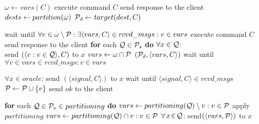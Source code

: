 \begin{algorithm}[h!]
\small

\begin{distribalgo}[1]

	\STATE $\omega \leftarrow vars(C)$
		\STATE execute command $C$
		\STATE send response to the client
		\STATE $dests \leftarrow partition(\omega)$
		\STATE $\mathcal{P}_d \leftarrow target(dest, C)$

			\STATE wait until $\forall v \in \omega \setminus \mathcal{P}: \exists \langle vars, C \rangle \in rcvd\_msgs :v \in vars$
			\STATE execute command $C$
			\STATE send response to the client
			\STATE \textbf{for} each $\mathcal{Q} \in \mathcal{P}_s$ \textbf{do} $\forall x \in \mathcal{Q}$: \\
				\hfill send $(\langle v:v \in \mathcal{Q} \rangle, C)$ to $x$
			\STATE $vars \leftarrow \omega \cap \mathcal{P}$
			\STATE \rmcast$(\mathcal{P}_d, \langle vars, C \rangle)$
			\STATE wait until $\forall v \in vars \in rcvd\_msgs : v \in vars$
		\ENDIF		
	\ENDIF
\ENDINDENT

\vspace{1.0mm}

\vspace{1.0mm}
	\STATE $\forall x \in oracle$: send $(\langle signal, C \rangle )$ to $x$
	\STATE wait until $\langle signal, C \rangle \in rcvd\_msgs$
	\STATE $\mathcal{P} \leftarrow \mathcal{P} \cup \{v\}$
	\STATE send $ok$ to the client
\ENDINDENT

\vspace{1.0mm}
	\STATE \textbf{for} each $\mathcal{Q} \in \mathcal{P}_v \in partitioning$ \textbf{do} 
			\STATE $vars \leftarrow partitioning(\mathcal{Q}) \setminus v:v \in \mathcal{P}$
				\STATE apply $partitioning$
			\ENDIF
		\ELSE 
			\STATE $vars \leftarrow partitioning(\mathcal{Q}) \cap v:v \in \mathcal{P}$
			\STATE $\forall\,x\!\in\!\mathcal{Q}$: send$(\langle vars, \mathcal{P} \rangle )$ to $x$
		\ENDIF
\ENDINDENT


\end{distribalgo}
\end{algorithm}
